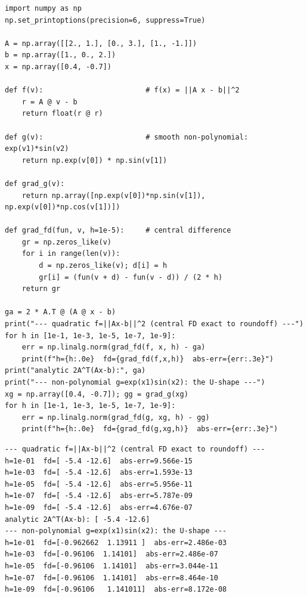 \begin{lstlisting}[caption={\ttfamily code/ch11\_fd\_check.py --- the
professional habit: every hand gradient gets a finite-difference check.
Two functions shown, and the sweet spot lands where it should.}]
import numpy as np
np.set_printoptions(precision=6, suppress=True)

A = np.array([[2., 1.], [0., 3.], [1., -1.]])
b = np.array([1., 0., 2.])
x = np.array([0.4, -0.7])

def f(v):                        # f(x) = ||A x - b||^2
    r = A @ v - b
    return float(r @ r)

def g(v):                        # smooth non-polynomial: exp(v1)*sin(v2)
    return np.exp(v[0]) * np.sin(v[1])

def grad_g(v):
    return np.array([np.exp(v[0])*np.sin(v[1]), np.exp(v[0])*np.cos(v[1])])

def grad_fd(fun, v, h=1e-5):     # central difference
    gr = np.zeros_like(v)
    for i in range(len(v)):
        d = np.zeros_like(v); d[i] = h
        gr[i] = (fun(v + d) - fun(v - d)) / (2 * h)
    return gr

ga = 2 * A.T @ (A @ x - b)
print("--- quadratic f=||Ax-b||^2 (central FD exact to roundoff) ---")
for h in [1e-1, 1e-3, 1e-5, 1e-7, 1e-9]:
    err = np.linalg.norm(grad_fd(f, x, h) - ga)
    print(f"h={h:.0e}  fd={grad_fd(f,x,h)}  abs-err={err:.3e}")
print("analytic 2A^T(Ax-b):", ga)
print("--- non-polynomial g=exp(x1)sin(x2): the U-shape ---")
xg = np.array([0.4, -0.7]); gg = grad_g(xg)
for h in [1e-1, 1e-3, 1e-5, 1e-7, 1e-9]:
    err = np.linalg.norm(grad_fd(g, xg, h) - gg)
    print(f"h={h:.0e}  fd={grad_fd(g,xg,h)}  abs-err={err:.3e}")
\end{lstlisting}

\begin{lstlisting}[caption={Output of the gradient checker. Notice on the
quadratic, central differences are exact to roundoff (error GROWS only
as $h$ shrinks) --- while the smooth function shows the textbook U-shape
plotted in Figure~\ref{fig:fdlog}: too big $h$ truncates, too small
amplifies roundoff, $h\approx10^{-5}$ wins.}]
--- quadratic f=||Ax-b||^2 (central FD exact to roundoff) ---
h=1e-01  fd=[ -5.4 -12.6]  abs-err=9.566e-15
h=1e-03  fd=[ -5.4 -12.6]  abs-err=1.593e-13
h=1e-05  fd=[ -5.4 -12.6]  abs-err=5.956e-11
h=1e-07  fd=[ -5.4 -12.6]  abs-err=5.787e-09
h=1e-09  fd=[ -5.4 -12.6]  abs-err=4.676e-07
analytic 2A^T(Ax-b): [ -5.4 -12.6]
--- non-polynomial g=exp(x1)sin(x2): the U-shape ---
h=1e-01  fd=[-0.962662  1.13911 ]  abs-err=2.486e-03
h=1e-03  fd=[-0.96106  1.14101]  abs-err=2.486e-07
h=1e-05  fd=[-0.96106  1.14101]  abs-err=3.044e-11
h=1e-07  fd=[-0.96106  1.14101]  abs-err=8.464e-10
h=1e-09  fd=[-0.96106   1.141011]  abs-err=8.172e-08
\end{lstlisting}

